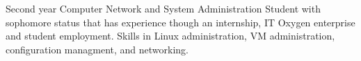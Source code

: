 

\begin{cvparagraph}

Second year Computer Network and System Administration Student with sophomore status that has experience though an internship, IT Oxygen enterprise and student employment. Skills in Linux administration, VM administration, configuration managment, and networking.
\end{cvparagraph}
